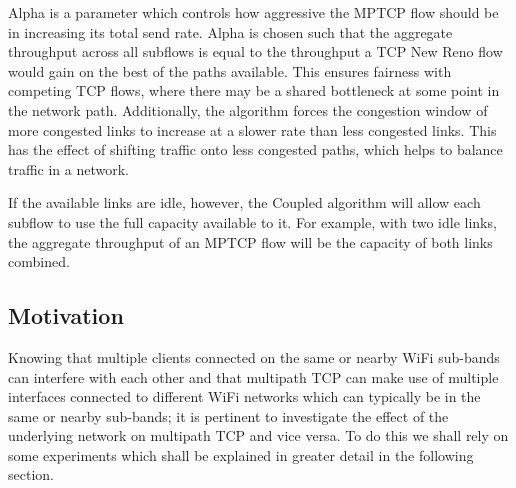 Alpha is a parameter which controls how aggressive the MPTCP flow should be in
increasing its total send rate. Alpha is chosen such that the aggregate
throughput across all subflows is equal to the throughput a TCP New Reno flow
would gain on the best of the paths available. This ensures fairness with
competing TCP flows, where there may be a shared bottleneck at some point in the
network path. Additionally, the algorithm forces the congestion window of more
congested links to increase at a slower rate than less congested links. This has
the effect of shifting traffic  onto less congested paths, which helps to
balance traffic in a network.

If the available links are idle, however, the Coupled algorithm will allow each
subflow to use the full capacity available to it. For example, with two idle
links, the aggregate throughput of an MPTCP flow will be the capacity of both
links combined.

\subsection{Motivation}
Knowing that multiple clients connected on the same or nearby WiFi sub-bands 
can interfere with each other and that multipath TCP can make use of multiple 
interfaces connected to different WiFi networks which can typically be in the 
same or nearby sub-bands; it is pertinent to investigate the effect of the 
underlying network on multipath TCP and vice versa. To do this we shall rely on 
some experiments which shall be explained in greater detail in the following 
section.



